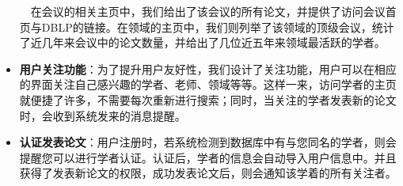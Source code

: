 \begin{itemize}
$\quad$在会议的相关主页中，我们给出了该会议的所有论文，并提供了访问会议首页与DBLP的链接。在领域的主页中，我们则列举了该领域的顶级会议，统计了近几年来会议中的论文数量，并给出了几位近五年来领域最活跃的学者。

\item {\bf 用户关注功能}：为了提升用户友好性，我们设计了关注功能，用户可以在相应的界面关注自己感兴趣的学者、老师、领域等等。这样一来，访问学者的主页就便捷了许多，不需要每次重新进行搜索；同时，当关注的学者发表新的论文时，会收到系统发来的消息提醒。

\begin{figure}[h]
\centering
{}
\hspace{0.3cm}
\end{figure}

\item {\bf 认证发表论文}：用户注册时，若系统检测到数据库中有与您同名的学者，则会提醒您可以进行学者认证。认证后，学者的信息会自动导入用户信息中。并且获得了发表新论文的权限，成功发表论文后，则会通知该学着的所有关注者。

\begin{figure}[h]
\centering
{}
\hspace{0.3cm}
\end{figure}


\end{itemize}
